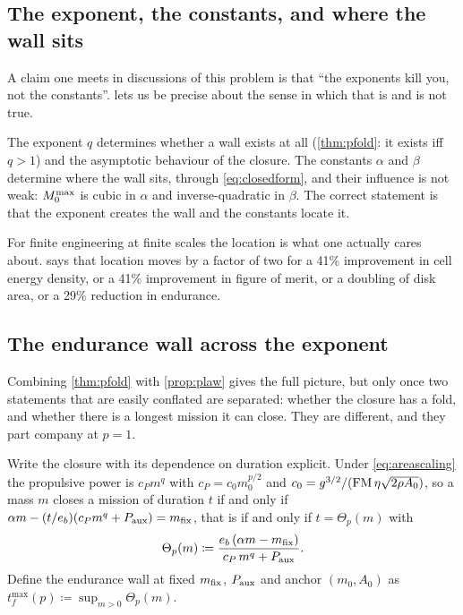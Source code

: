 \subsection{The exponent, the constants, and where the wall sits}

A claim one meets in discussions of this problem is that ``the exponents kill
you, not the constants''.  lets us be precise about the
sense in which that is and is not true.

\begin{observation}
\label{obs:expconst}
The exponent $q$ determines whether a wall exists at all
(\cref{thm:pfold}: it exists iff $q>1$) and the asymptotic behaviour of the
closure. The constants $\alpha$ and $\beta$ determine where the wall sits,
through \cref{eq:closedform}, and their influence is not weak: $M_0^{\max}$ is
cubic in $\alpha$ and inverse-quadratic in $\beta$. The correct statement is
that the exponent creates the wall and the constants locate it.
\end{observation}

For finite engineering at finite scales the location is what one actually
cares about.  says that location moves by a factor of two
for a 41\% improvement in cell energy density, or a 41\% improvement in figure
of merit, or a doubling of disk area, or a 29\% reduction in endurance.

\subsection{The endurance wall across the exponent}

Combining \cref{thm:pfold} with \cref{prop:plaw} gives the full picture, but
only once two statements that are easily conflated are separated: whether the
closure has a fold, and whether there is a longest mission it can close. They
are different, and they part company at $p=1$.

Write the closure with its dependence on duration explicit. Under
\cref{eq:areascaling} the propulsive power is $c_P m^q$ with
$c_P = c_0 m_0^{p/2}$ and $c_0 = g^{3/2}/(\mathrm{FM}\,\eta\sqrt{2\rho A_0})$, so a mass
$m$ closes a mission of duration $t$ if and only if
$\alpha m - (t/e_b)(c_P m^q + P_{\mathrm{aux}}) = m_{\mathrm{fix}}$, that is if and only if
$t = \Theta_p(m)$ with
\begin{equation}
  \Theta_p(m) \coloneqq
  \frac{e_b\,(\alpha m - m_{\mathrm{fix}})}{c_P\, m^{q} + P_{\mathrm{aux}}} .
  \label{eq:theta}
\end{equation}
Define the endurance wall at fixed $m_{\mathrm{fix}}$, $P_{\mathrm{aux}}$ and anchor $(m_0,A_0)$ as
$t_f^{\max}(p) \coloneqq \sup_{m>0}\Theta_p(m)$.

